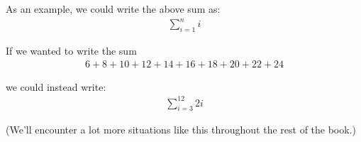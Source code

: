 \documentclass{book}
\begin{document}
As an example, we could write the above sum as:
\begin{align*}
\sum_{i=1}^n i
\end{align*}

If we wanted to write the sum
\begin{align*}
6 + 8 + 10 + 12 + 14 + 16 + 18 + 20 + 22 + 24
\end{align*}

we could instead write:
\begin{align*}
\sum_{i=3}^{12} 2i
\end{align*}


(We'll encounter a lot more situations like this throughout the rest of the book.)






\end{document}
